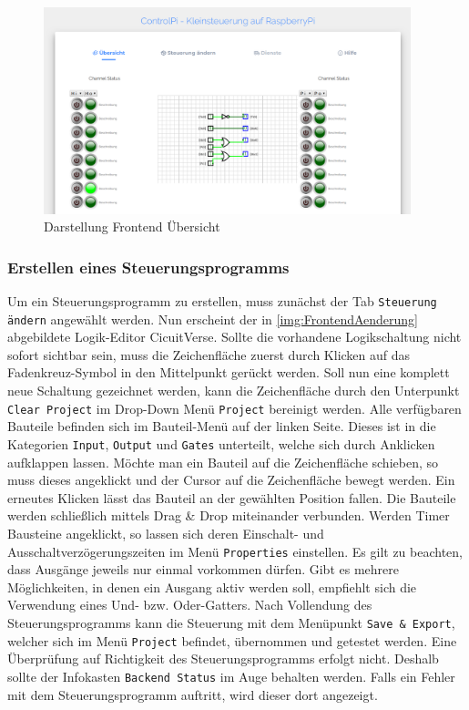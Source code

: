  \begin{figure}[H]
	\begin{center}
		\includegraphics[width=0.95\textwidth]{./images/FrontendUebersicht.png}
		\caption{Darstellung Frontend Übersicht}
		\label{img:FrontendUebersicht}
	\end{center} 
\end{figure}

\subsubsection{Erstellen eines Steuerungsprogramms}

Um ein Steuerungsprogramm zu erstellen, muss zunächst der Tab \texttt{Steuerung ändern} angewählt werden. Nun erscheint der in \autoref{img:FrontendAenderung} abgebildete Logik-Editor CicuitVerse.\cite{URL:CircuitVerse} Sollte die vorhandene Logikschaltung nicht sofort sichtbar sein, muss die Zeichenfläche zuerst durch Klicken auf das Fadenkreuz-Symbol in den Mittelpunkt gerückt werden. Soll nun eine komplett neue Schaltung gezeichnet werden, kann die Zeichenfläche durch den Unterpunkt \texttt{Clear Project} im Drop-Down Menü \texttt{Project} bereinigt werden. Alle verfügbaren Bauteile befinden sich im Bauteil-Menü auf der linken Seite. Dieses ist in die Kategorien \texttt{Input}, \texttt{Output} und \texttt{Gates} unterteilt, welche sich durch Anklicken aufklappen lassen. Möchte man ein Bauteil auf die Zeichenfläche schieben, so muss dieses angeklickt und der Cursor auf die Zeichenfläche bewegt werden. Ein erneutes Klicken lässt das Bauteil an der gewählten Position fallen. Die Bauteile werden schließlich mittels Drag \& Drop miteinander verbunden. Werden Timer Bausteine angeklickt, so lassen  sich deren Einschalt- und Ausschaltverzögerungszeiten im Menü \texttt{Properties} einstellen. Es gilt zu beachten, dass Ausgänge jeweils nur einmal vorkommen dürfen. Gibt es mehrere Möglichkeiten, in denen ein Ausgang aktiv werden soll, empfiehlt sich die Verwendung eines Und- bzw. Oder-Gatters. Nach Vollendung des Steuerungsprogramms kann die Steuerung mit dem Menüpunkt \texttt{Save \& Export}, welcher sich im Menü \texttt{Project} befindet, übernommen und getestet werden. Eine Überprüfung auf Richtigkeit des Steuerungsprogramms erfolgt nicht. Deshalb sollte der Infokasten \texttt{Backend Status} im Auge behalten werden. Falls ein Fehler mit dem Steuerungsprogramm auftritt, wird dieser dort angezeigt. 
	

